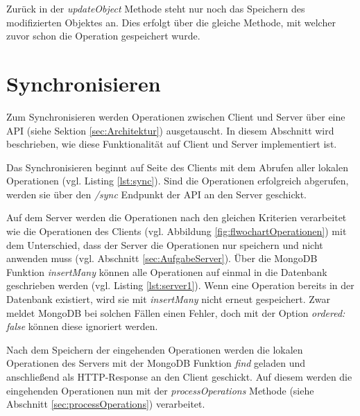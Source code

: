 \documentclass[a4paper, 12pt]{scrreprt}
\begin{document}
Zurück in der \textit{updateObject} Methode steht nur noch das Speichern des modifizierten Objektes an. Dies erfolgt über die gleiche Methode, mit welcher zuvor schon die Operation gespeichert wurde.

\section{Synchronisieren}

Zum Synchronisieren werden Operationen zwischen Client und Server über eine API (siehe Sektion \ref{sec:Architektur}) ausgetauscht. In diesem Abschnitt wird beschrieben, wie diese Funktionalität auf Client und Server implementiert ist.

Das Synchronisieren beginnt auf Seite des Clients mit dem Abrufen aller lokalen Operationen (vgl. Listing \ref{lst:sync}). Sind die Operationen erfolgreich abgerufen, werden sie über den \textit{/sync} Endpunkt der API an den Server geschickt. 

\begin{minipage}{\linewidth}
	
\end{minipage}

Auf dem Server werden die Operationen nach den gleichen Kriterien verarbeitet wie die Operationen des Clients (vgl. Abbildung \ref{fig:flwochartOperationen}) mit dem Unterschied, dass der Server die Operationen nur speichern und nicht anwenden muss (vgl. Abschnitt \ref{sec:AufgabeServer}). Über die MongoDB Funktion \textit{insertMany} können alle Operationen auf einmal in die Datenbank geschrieben werden (vgl. Listing  \ref{lst:server1}). Wenn eine Operation bereits in der Datenbank existiert, wird sie mit \textit{insertMany} nicht erneut gespeichert. Zwar meldet MongoDB bei solchen Fällen einen Fehler, doch mit der Option \textit{ordered: false} können diese ignoriert werden.

Nach dem Speichern der eingehenden Operationen werden die lokalen Operationen des Servers mit der MongoDB Funktion \textit{find} geladen und anschließend als HTTP-Response an den Client geschickt. Auf diesem werden die eingehenden Operationen nun mit der \textit{processOperations} Methode (siehe Abschnitt \ref{sec:processOperations}) verarbeitet.

\begin{minipage}{\linewidth}
	
\end{minipage}
\end{document}
